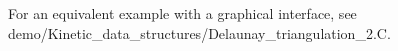 For an equivalent example with a graphical interface, see
demo/Kinetic\_data\_structures/Delaunay\_triangulation\_2.C.

\begin{figure}[htb]
\end{figure}
